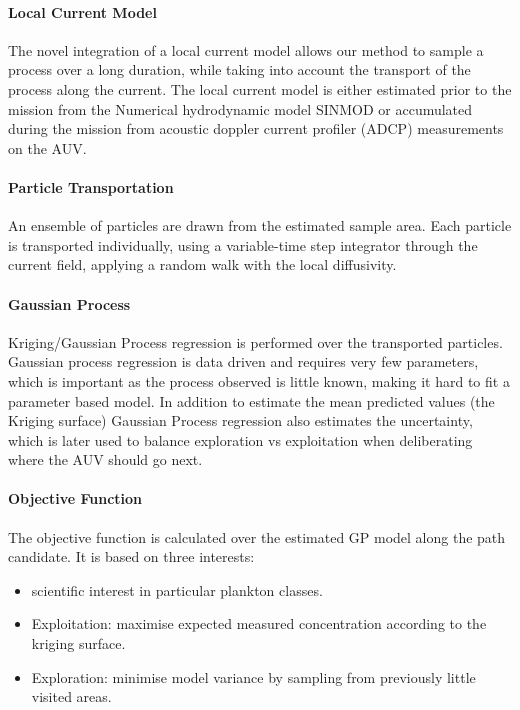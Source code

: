 \documentclass[conference]{IEEEtran}
\begin{document}
\paragraph{Local Current Model}
The novel integration of a local current model allows our method to sample a process over a long duration, while taking into account the transport of the process along the current.
The local current model is either estimated prior to the mission from the Numerical hydrodynamic model SINMOD or accumulated during the mission from acoustic doppler current profiler (ADCP) measurements on the AUV.

\paragraph{Particle Transportation}
An ensemble of particles are drawn from the estimated sample area. 
Each particle is transported individually, using a variable-time step integrator through the current field, applying a random walk with the local diffusivity.

\paragraph{Gaussian Process}
Kriging/Gaussian Process regression is performed over the transported particles.
Gaussian process regression is data driven and requires very few parameters, which is important as the process observed is little known, making it hard to fit a parameter based model.
In addition to estimate the mean predicted values (the Kriging surface) Gaussian Process regression also estimates the uncertainty, which is later used to balance exploration vs exploitation when deliberating where the AUV should go next.

\paragraph{Objective Function}
The objective function is calculated over the estimated GP model along the path candidate.
It is based on three interests:
\begin{itemize}
    \item scientific interest in particular plankton classes.
    \item Exploitation: maximise expected measured concentration according to the kriging surface.
    \item Exploration: minimise model variance by sampling from previously little visited areas.
\end{itemize}
\end{document}
